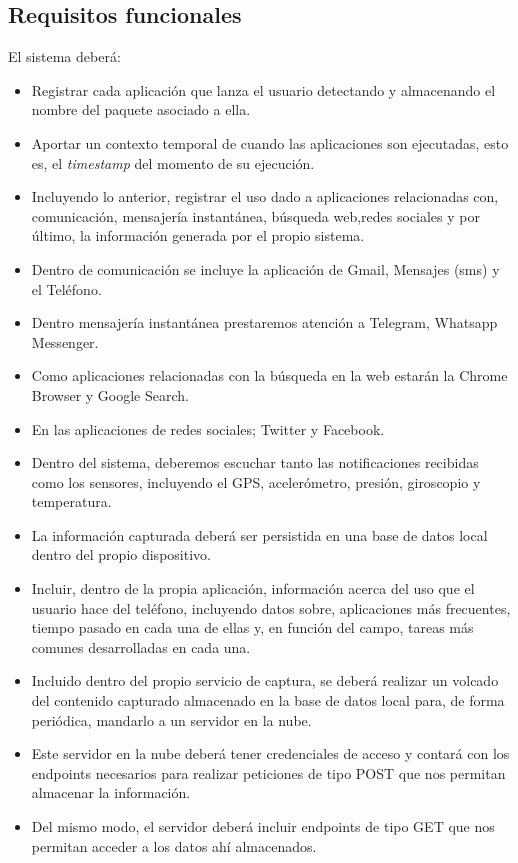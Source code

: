 \documentclass[12pt,a4paper,oneside]{book} %
\begin{document}
\subsection{Requisitos funcionales}
El sistema deberá:
\begin{itemize}
  \item Registrar cada aplicación que lanza el usuario detectando y almacenando el nombre del paquete asociado a ella. 
  \item Aportar un contexto temporal de cuando las aplicaciones son ejecutadas, esto es, el \textit{timestamp} del momento de su ejecución. 
  \item Incluyendo lo anterior, registrar el uso dado a aplicaciones relacionadas con, comunicación, mensajería instantánea, búsqueda web,redes sociales y por último, la información generada por el propio sistema. 
  \item Dentro de comunicación se incluye la aplicación de Gmail, Mensajes (sms) y el Teléfono. 
  \item Dentro mensajería instantánea prestaremos atención a Telegram, Whatsapp Messenger.
  \item Como aplicaciones relacionadas con la búsqueda en la web estarán la Chrome Browser y Google Search. 
  \item En las aplicaciones de redes sociales; Twitter y Facebook.
  \item Dentro del sistema, deberemos escuchar tanto las notificaciones recibidas como los sensores, incluyendo el GPS, acelerómetro, presión, giroscopio y temperatura.
    \item La información capturada deberá ser persistida en una base de datos local dentro del propio dispositivo. 
  \item Incluir, dentro de la propia aplicación, información acerca del uso que el usuario hace del teléfono, incluyendo datos sobre, aplicaciones más frecuentes, tiempo pasado en cada una de ellas y, en función del campo, tareas más comunes desarrolladas en cada una.
  \item Incluido dentro del propio servicio de captura, se deberá realizar un volcado del contenido capturado almacenado en la base de datos local para, de forma periódica, mandarlo a un servidor en la nube. 
  \item Este servidor en la nube deberá tener credenciales de acceso y contará con los endpoints necesarios para realizar peticiones de tipo POST que nos permitan almacenar la información. 
  \item Del mismo modo, el servidor deberá incluir endpoints de tipo GET que nos permitan acceder a los datos ahí almacenados. 

\end{itemize}
\end{document}
